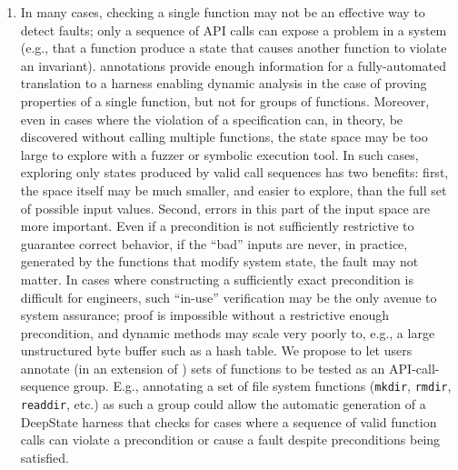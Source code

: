 \begin{enumerate}[labelsep=3pt,leftmargin=12pt]
\item In many cases, checking a single function may not be an effective way to detect faults; only a sequence of API calls can expose a problem in a system (e.g., that a function produce a state that causes another function to violate an invariant).  \acsl annotations provide enough information for a fully-automated translation to a harness enabling dynamic analysis in the case of proving properties of a single function, but not for groups of functions.  Moreover, even in cases where the violation of a specification can, in theory, be discovered without calling multiple functions, the state space may be too large to explore with a fuzzer or symbolic execution tool.  In such cases, exploring only states produced by valid call sequences has two benefits:  first, the space itself may be much smaller, and easier to explore, than the full set of possible input values.  Second, errors in this part of the input space are more important.  Even if a precondition is not sufficiently restrictive to guarantee correct behavior, if the ``bad'' inputs are never, in practice, generated by the functions that modify system state, the fault may not matter.  In cases where constructing a sufficiently exact precondition is difficult for engineers, such ``in-use'' verification may be the only avenue to system assurance; proof is impossible without a restrictive enough precondition, and dynamic methods may scale very poorly to, e.g., a large unstructured byte buffer such as a hash table.  We propose to let users annotate (in an extension of \acsl) sets of functions to be tested as an API-call-sequence group.  E.g., annotating a set of file system functions ({\tt mkdir}, {\tt rmdir}, {\tt readdir}, etc.) as such a group could allow the automatic generation of a DeepState harness that checks for cases where a sequence of valid function calls can violate a precondition or cause a fault despite preconditions being satisfied.
\end{enumerate}

